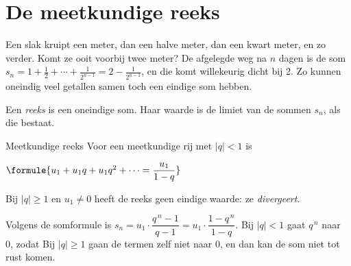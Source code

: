 \section{De meetkundige reeks}

Een slak kruipt een meter, dan een halve meter, dan een kwart meter, en zo verder. Komt ze ooit voorbij twee meter? De afgelegde weg na $n$ dagen is de som $s_n = 1 + \tfrac12 + \cdots + \tfrac{1}{2^{n-1}} = 2 - \tfrac{1}{2^{n-1}}$, en die komt willekeurig dicht bij 2. Zo kunnen oneindig veel getallen samen toch een eindige som hebben.

\begin{theorie}
Een \emph{reeks} is een oneindige som. Haar waarde is de limiet van de sommen $s_n$, als die bestaat.

\begin{stelling}{Meetkundige reeks}
Voor een meetkundige rij met $|q| < 1$ is

\vspace{1mm}
\qquad $\formule{u_1 + u_1 q + u_1 q^2 + \cdots = \dfrac{u_1}{1 - q}}$

\vspace{1mm}
Bij $|q| \geqslant 1$ en $u_1 \neq 0$ heeft de reeks geen eindige waarde: ze \emph{divergeert}.
\end{stelling}

\begin{bewijs}
Volgens de somformule is $s_n = u_1 \cdot \dfrac{q^{\,n} - 1}{q - 1} = u_1 \cdot \dfrac{1 - q^{\,n}}{1 - q}$. Bij $|q| < 1$ gaat $q^{\,n}$ naar 0, zodat
Bij $|q| \geqslant 1$ gaan de termen zelf niet naar 0, en dan kan de som niet tot rust komen.
\end{bewijs}
\end{theorie}



